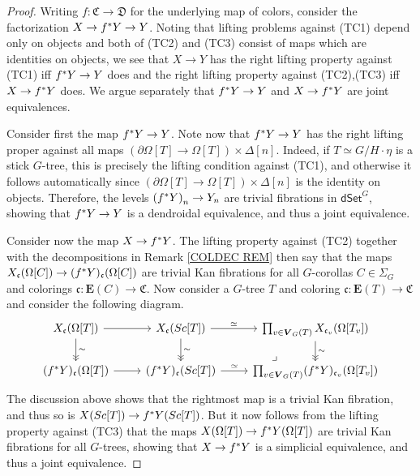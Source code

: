 \documentclass[a4paper,10pt
,draft
]{article}%
\numberwithin{equation}{section}
\numberwithin{figure}{section}
\theoremstyle{definition} %
\newcommand{\1}{\ensuremath{\mathbbm 1}}%
\begin{document}
\begin{proof}
Writing $f \colon \mathfrak{C} \to \mathfrak{D}$ for the underlying map of colors,
consider the factorization $X \to f^{\**}Y \to Y$.
%
Noting that lifting problems against (TC1) depend only on objects and both of (TC2) and (TC3) consist of maps which are identities on objects,
we see that $X \to Y$ has the right lifting property against (TC1) iff 
$f^{\**} Y \to Y$ does
and the right lifting property against 
(TC2),(TC3) iff $X \to f^{\**}Y$ does.
We argue separately that 
$f^{\**} Y \to Y$ and $X \to f^{\**}Y$
are joint equivalences.

Consider first the map $f^{\**} Y \to Y$. Note now that $f^{\**} Y \to Y$ has the right lifting proper against all maps 
$\left(\partial \Omega[T] \to \Omega[T] \right) \times \Delta[n]$.
Indeed, if $T \simeq G/H \cdot \eta$ is a stick $G$-tree,
this is precisely the lifting condition against (TC1), and otherwise it follows automatically since $\left(\partial \Omega[T] \to \Omega[T] \right) \times \Delta[n]$ is the identity on objects.
Therefore, the levels 
$\left(f^{\**} Y \right)_n \to Y_n$ are trivial fibrations in 
$\mathsf{dSet}^G$, showing that 
$f^{\**} Y \to Y$ is a dendroidal equivalence, 
and thus a joint equivalence. 

Consider now the map $X \to f^{\**} Y$.
The lifting property against (TC2) 
together with the decompositions in
Remark \ref{COLDEC REM}
then say that the maps
$X_{\mathfrak{c}}(\Omega[C]) \to 
(f^{\**} Y)_{\mathfrak{c}} (\Omega[C])$
are trivial Kan fibrations for all $G$-corollas $C \in \Sigma_G$
and colorings $\mathfrak{c} \colon \boldsymbol{E}(C) \to \mathfrak{C}$.
Now consider a $G$-tree $T$ and coloring
$\mathfrak{c} \colon \boldsymbol{E}(T) \to \mathfrak{C}$
and consider the following diagram.
\[
\begin{tikzcd}
X_{\mathfrak{c}}(\Omega[T]) \ar{r} \ar[->>]{d}{\sim}
&
X_{\mathfrak{c}}(Sc[T]) \ar{r}{\simeq} \ar[->>]{d}{\sim}
&
\prod_{v \in \boldsymbol{V}_G(T)} 
X_{\mathfrak{c}_v}(\Omega[T_v])
\ar[->>]{d}{\sim}
\\
(f^{\**} Y)_{\mathfrak{c}}(\Omega[T]) \ar{r}
&
(f^{\**} Y)_{\mathfrak{c}}(Sc[T]) \ar{r}{\simeq} 
&
\prod_{v \in \boldsymbol{V}_G(T)} 
(f^{\**} Y)_{\mathfrak{c}_v}
(\Omega[T_v]) 
\arrow[ul, phantom, "\lrcorner", very near start]
\end{tikzcd}
\]
The discussion above shows that the rightmost map is a trivial Kan fibration,
and thus so is 
$X(Sc[T]) \to f^{\**} Y (Sc[T])$.
But it now follows from the lifting property against
(TC3) that the maps 
$X(\Omega[T]) \to f^{\**} Y (\Omega[T])$
are trivial Kan fibrations for all $G$-trees,
showing that $X \to f^{\**} Y$ is a simplicial equivalence, and thus a joint equivalence. 
\end{proof}
\end{document}
